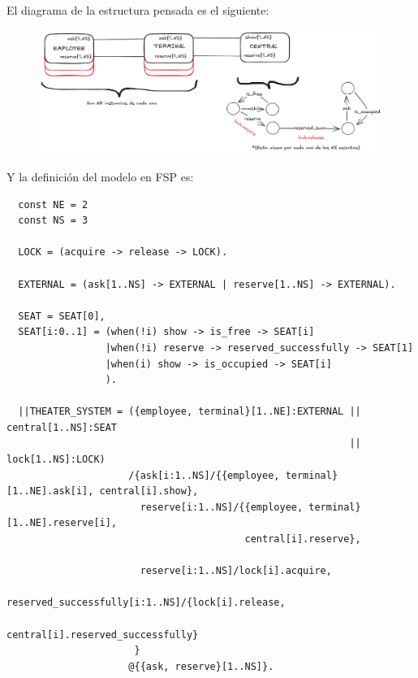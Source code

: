 \documentclass{article}
\begin{document}
El diagrama de la estructura pensada es el siguiente:
\begin{figure}[ht]
	\includegraphics[width=1\textwidth]{02-03.png}
	\centering
\end{figure}

Y la definición del modelo en  FSP es:
\begin{verbatim}
  const NE = 2
  const NS = 3

  LOCK = (acquire -> release -> LOCK).

  EXTERNAL = (ask[1..NS] -> EXTERNAL | reserve[1..NS] -> EXTERNAL).

  SEAT = SEAT[0],
  SEAT[i:0..1] = (when(!i) show -> is_free -> SEAT[i]
                 |when(!i) reserve -> reserved_successfully -> SEAT[1]
                 |when(i) show -> is_occupied -> SEAT[i]
                 ).

  ||THEATER_SYSTEM = ({employee, terminal}[1..NE]:EXTERNAL || central[1..NS]:SEAT
                                                           || lock[1..NS]:LOCK)
                     /{ask[i:1..NS]/{{employee, terminal}[1..NE].ask[i], central[i].show},
                       reserve[i:1..NS]/{{employee, terminal}[1..NE].reserve[i],
                                         central[i].reserve},
                       
                       reserve[i:1..NS]/lock[i].acquire,
                       reserved_successfully[i:1..NS]/{lock[i].release,
                                                       central[i].reserved_successfully}
                      }
                     @{{ask, reserve}[1..NS]}.
\end{verbatim}
\end{document}
